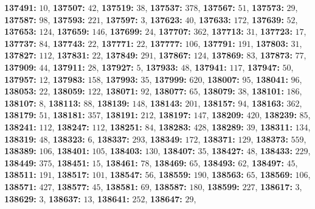 \textsf{\bfseries 137491:} $10$, \textsf{\bfseries 137507:} $42$, \textsf{\bfseries 137519:} $38$, \textsf{\bfseries 137537:} $378$, \textsf{\bfseries 137567:} $51$, \textsf{\bfseries 137573:} $29$, \textsf{\bfseries 137587:} $98$, \textsf{\bfseries 137593:} $221$, \textsf{\bfseries 137597:} $3$, \textsf{\bfseries 137623:} $40$, \textsf{\bfseries 137633:} $172$, \textsf{\bfseries 137639:} $52$, \textsf{\bfseries 137653:} $124$, \textsf{\bfseries 137659:} $146$, \textsf{\bfseries 137699:} $24$, \textsf{\bfseries 137707:} $362$, \textsf{\bfseries 137713:} $31$, \textsf{\bfseries 137723:} $17$, \textsf{\bfseries 137737:} $84$, \textsf{\bfseries 137743:} $22$, \textsf{\bfseries 137771:} $22$, \textsf{\bfseries 137777:} $106$, \textsf{\bfseries 137791:} $191$, \textsf{\bfseries 137803:} $31$, \textsf{\bfseries 137827:} $112$, \textsf{\bfseries 137831:} $22$, \textsf{\bfseries 137849:} $291$, \textsf{\bfseries 137867:} $124$, \textsf{\bfseries 137869:} $83$, \textsf{\bfseries 137873:} $77$, \textsf{\bfseries 137909:} $44$, \textsf{\bfseries 137911:} $28$, \textsf{\bfseries 137927:} $5$, \textsf{\bfseries 137933:} $48$, \textsf{\bfseries 137941:} $117$, \textsf{\bfseries 137947:} $50$, \textsf{\bfseries 137957:} $12$, \textsf{\bfseries 137983:} $158$, \textsf{\bfseries 137993:} $35$, \textsf{\bfseries 137999:} $620$, \textsf{\bfseries 138007:} $95$, \textsf{\bfseries 138041:} $96$, \textsf{\bfseries 138053:} $22$, \textsf{\bfseries 138059:} $122$, \textsf{\bfseries 138071:} $92$, \textsf{\bfseries 138077:} $65$, \textsf{\bfseries 138079:} $38$, \textsf{\bfseries 138101:} $186$, \textsf{\bfseries 138107:} $8$, \textsf{\bfseries 138113:} $88$, \textsf{\bfseries 138139:} $148$, \textsf{\bfseries 138143:} $201$, \textsf{\bfseries 138157:} $94$, \textsf{\bfseries 138163:} $362$, \textsf{\bfseries 138179:} $51$, \textsf{\bfseries 138181:} $357$, \textsf{\bfseries 138191:} $212$, \textsf{\bfseries 138197:} $147$, \textsf{\bfseries 138209:} $420$, \textsf{\bfseries 138239:} $85$, \textsf{\bfseries 138241:} $112$, \textsf{\bfseries 138247:} $112$, \textsf{\bfseries 138251:} $84$, \textsf{\bfseries 138283:} $428$, \textsf{\bfseries 138289:} $39$, \textsf{\bfseries 138311:} $134$, \textsf{\bfseries 138319:} $48$, \textsf{\bfseries 138323:} $6$, \textsf{\bfseries 138337:} $293$, \textsf{\bfseries 138349:} $172$, \textsf{\bfseries 138371:} $129$, \textsf{\bfseries 138373:} $559$, \textsf{\bfseries 138389:} $106$, \textsf{\bfseries 138401:} $105$, \textsf{\bfseries 138403:} $130$, \textsf{\bfseries 138407:} $35$, \textsf{\bfseries 138427:} $48$, \textsf{\bfseries 138433:} $229$, \textsf{\bfseries 138449:} $375$, \textsf{\bfseries 138451:} $15$, \textsf{\bfseries 138461:} $78$, \textsf{\bfseries 138469:} $65$, \textsf{\bfseries 138493:} $62$, \textsf{\bfseries 138497:} $45$, \textsf{\bfseries 138511:} $191$, \textsf{\bfseries 138517:} $101$, \textsf{\bfseries 138547:} $56$, \textsf{\bfseries 138559:} $190$, \textsf{\bfseries 138563:} $65$, \textsf{\bfseries 138569:} $106$, \textsf{\bfseries 138571:} $427$, \textsf{\bfseries 138577:} $45$, \textsf{\bfseries 138581:} $69$, \textsf{\bfseries 138587:} $180$, \textsf{\bfseries 138599:} $227$, \textsf{\bfseries 138617:} $3$, \textsf{\bfseries 138629:} $3$, \textsf{\bfseries 138637:} $13$, \textsf{\bfseries 138641:} $252$, \textsf{\bfseries 138647:} $29$, 
